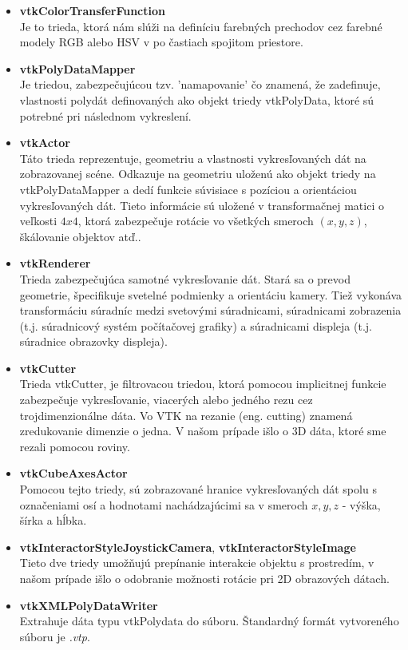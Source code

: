 \documentclass[a4paper,12pt,twoside]{article}%
\begin{document}
\begin{itemize}
\item \textbf{vtkColorTransferFunction} \\
Je to trieda, ktorá nám slúži na definíciu farebných prechodov cez farebné modely RGB alebo HSV v po častiach spojitom priestore. 

\item \textbf{vtkPolyDataMapper} \\
Je triedou, zabezpečujúcou tzv. 'namapovanie' čo znamená, že zadefinuje, vlastnosti polydát definovaných ako objekt triedy vtkPolyData, ktoré sú potrebné pri následnom vykreslení.

\item \textbf{vtkActor} \\
Táto trieda reprezentuje, geometriu a vlastnosti vykresľovaných dát na zobrazovanej scéne. Odkazuje na geometriu uloženú ako objekt triedy na vtkPolyDataMapper a dedí funkcie súvisiace s pozíciou a orientáciou vykresľovaných dát. Tieto informácie sú uložené v transformačnej matici o veľkosti $4x4$, ktorá zabezpečuje rotácie vo všetkých smeroch $(x, y, z)$, škálovanie objektov atď..

\item \textbf{vtkRenderer} \\
Trieda zabezpečujúca samotné vykresľovanie dát. Stará sa o prevod geometrie, špecifikuje svetelné podmienky a orientáciu kamery. Tiež vykonáva transformáciu súradníc medzi svetovými súradnicami, súradnicami zobrazenia (t.j. súradnicový systém počítačovej grafiky) a súradnicami displeja (t.j.  súradnice obrazovky displeja).

\item \textbf{vtkCutter} \\
Trieda vtkCutter, je filtrovacou triedou, ktorá pomocou implicitnej funkcie zabezpečuje vykresľovanie, viacerých alebo jedného rezu cez trojdimenzionálne dáta. Vo VTK na rezanie (eng. cutting) znamená zredukovanie dimenzie o jedna. V našom prípade išlo o 3D dáta, ktoré sme rezali pomocou roviny. 

\item \textbf{vtkCubeAxesActor} \\
Pomocou tejto triedy, sú zobrazované hranice vykresľovaných dát spolu s označeniami osí a  hodnotami nachádzajúcimi sa v smeroch $x, y, z$ - výška, šírka a hĺbka.

\item \textbf{vtkInteractorStyleJoystickCamera}, \textbf{vtkInteractorStyleImage}  \\
Tieto dve triedy umožňujú prepínanie interakcie objektu s prostredím, v našom prípade išlo o odobranie možnosti rotácie pri 2D obrazových dátach.

\item \textbf{vtkXMLPolyDataWriter} \\
Extrahuje dáta typu vtkPolydata do súboru. Štandardný formát vytvoreného súboru je \textit{.vtp}. 
\end{itemize}
\end{document}
